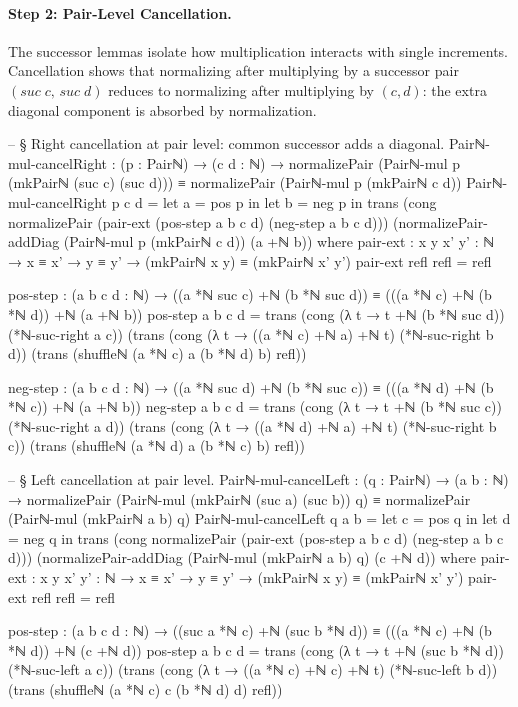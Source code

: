 \documentclass[11pt,a4paper]{book}
\begin{document}
\paragraph{Step 2: Pair-Level Cancellation.}
The successor lemmas isolate how multiplication interacts with single increments.
Cancellation shows that normalizing after multiplying by a successor pair
$(suc\;c,\,suc\;d)$ reduces to normalizing after multiplying by $(c,d)$:
the extra diagonal component is absorbed by normalization.

\begin{code}
-- § Right cancellation at pair level: common successor adds a diagonal.
Pairℕ-mul-cancelRight : (p : Pairℕ) → (c d : ℕ) →
  normalizePair (Pairℕ-mul p (mkPairℕ (suc c) (suc d))) ≡ normalizePair (Pairℕ-mul p (mkPairℕ c d))
Pairℕ-mul-cancelRight p c d =
  let a = pos p in
  let b = neg p in
  trans
    (cong normalizePair (pair-ext (pos-step a b c d) (neg-step a b c d)))
    (normalizePair-addDiag (Pairℕ-mul p (mkPairℕ c d)) (a +ℕ b))
  where
    pair-ext : {x y x' y' : ℕ} → x ≡ x' → y ≡ y' → (mkPairℕ x y) ≡ (mkPairℕ x' y')
    pair-ext refl refl = refl

    pos-step : (a b c d : ℕ) →
      ((a *ℕ suc c) +ℕ (b *ℕ suc d))
        ≡
      (((a *ℕ c) +ℕ (b *ℕ d)) +ℕ (a +ℕ b))
    pos-step a b c d =
      trans
        (cong (λ t → t +ℕ (b *ℕ suc d)) (*ℕ-suc-right a c))
        (trans
          (cong (λ t → ((a *ℕ c) +ℕ a) +ℕ t) (*ℕ-suc-right b d))
          (trans
            (shuffleℕ (a *ℕ c) a (b *ℕ d) b)
            refl))

    neg-step : (a b c d : ℕ) →
      ((a *ℕ suc d) +ℕ (b *ℕ suc c))
        ≡
      (((a *ℕ d) +ℕ (b *ℕ c)) +ℕ (a +ℕ b))
    neg-step a b c d =
      trans
        (cong (λ t → t +ℕ (b *ℕ suc c)) (*ℕ-suc-right a d))
        (trans
          (cong (λ t → ((a *ℕ d) +ℕ a) +ℕ t) (*ℕ-suc-right b c))
          (trans
            (shuffleℕ (a *ℕ d) a (b *ℕ c) b)
            refl))

-- § Left cancellation at pair level.
Pairℕ-mul-cancelLeft : (q : Pairℕ) → (a b : ℕ) →
  normalizePair (Pairℕ-mul (mkPairℕ (suc a) (suc b)) q) ≡ normalizePair (Pairℕ-mul (mkPairℕ a b) q)
Pairℕ-mul-cancelLeft q a b =
  let c = pos q in
  let d = neg q in
  trans
    (cong normalizePair (pair-ext (pos-step a b c d) (neg-step a b c d)))
    (normalizePair-addDiag (Pairℕ-mul (mkPairℕ a b) q) (c +ℕ d))
  where
    pair-ext : {x y x' y' : ℕ} → x ≡ x' → y ≡ y' → (mkPairℕ x y) ≡ (mkPairℕ x' y')
    pair-ext refl refl = refl

    pos-step : (a b c d : ℕ) →
      ((suc a *ℕ c) +ℕ (suc b *ℕ d))
        ≡
      (((a *ℕ c) +ℕ (b *ℕ d)) +ℕ (c +ℕ d))
    pos-step a b c d =
      trans
        (cong (λ t → t +ℕ (suc b *ℕ d)) (*ℕ-suc-left a c))
        (trans
          (cong (λ t → ((a *ℕ c) +ℕ c) +ℕ t) (*ℕ-suc-left b d))
          (trans
            (shuffleℕ (a *ℕ c) c (b *ℕ d) d)
            refl))


\end{code}
\end{document}
